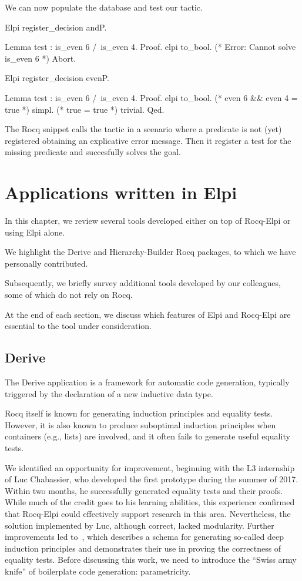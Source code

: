 \documentclass[a4paper, 11pt]{book}
\begin{document}
We can now populate the database and test our tactic.

\begin{rocqcode}
Elpi register_decision andP.

Lemma test : is_even 6 /\ is_even 4.
Proof.
elpi to_bool. (* Error: Cannot solve is_even 6 *)
Abort.

Elpi register_decision evenP.

Lemma test : is_even 6 /\ is_even 4.
Proof.
elpi to_bool. (* even 6 && even 4 = true *)
simpl.        (* true = true *)
trivial.
Qed.
\end{rocqcode}
  
The Rocq snippet calls the  tactic in a scenario
where a predicate is not (yet) registered obtaining an explicative
error message. Then it register a test for the missing predicate
and succesfully solves the goal.


\chapter{Applications written in Elpi}

In this chapter, we review several tools developed either on top of Rocq-Elpi or using Elpi alone.

We highlight the Derive and Hierarchy-Builder Rocq packages, to which we have personally contributed.

Subsequently, we briefly survey additional tools developed by our colleagues, some of which do not rely on Rocq.

At the end of each section, we discuss which features of Elpi and Rocq-Elpi are essential to the tool under consideration.

\section{Derive}\label{sec:derive}

The Derive application is a framework for automatic code generation, 
typically triggered by the declaration of a new inductive data type.

Rocq itself is known for generating induction principles and equality tests.
However, it is also known to produce suboptimal induction principles when
containers (e.g., lists) are involved, and it often fails to generate useful
equality tests.

We identified an opportunity for improvement, beginning with the L3
internship of Luc Chabassier, who developed the first prototype during the
summer of 2017. Within two months, he successfully generated equality tests
and their proofs. While much of the credit goes to his learning abilities,
this experience confirmed that Rocq-Elpi could effectively support research
in this area. Nevertheless, the solution implemented by Luc, although correct,
lacked modularity. Further improvements led to~\cite{tassi:hal-01897468},
which describes a schema for generating so-called deep induction principles
and demonstrates their use in proving the correctness of equality tests.
Before discussing this work, we need to introduce the ``Swiss army knife''
of boilerplate code generation: parametricity.
\end{document}
